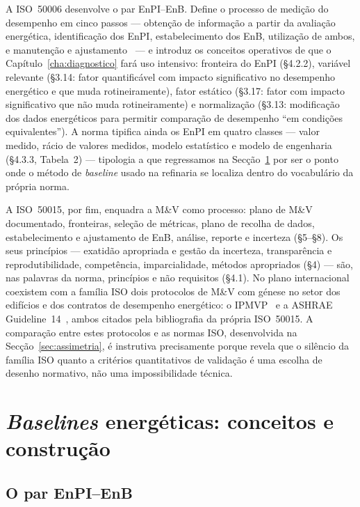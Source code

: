 A ISO~50006 desenvolve o par EnPI--EnB. Define o processo de medição do desempenho em cinco passos --- obtenção de informação a partir da avaliação energética, identificação dos EnPI, estabelecimento dos EnB, utilização de ambos, e manutenção e ajustamento~\cite[Figura~2]{ISO50006_2014} --- e introduz os conceitos operativos de que o Capítulo~\ref{cha:diagnostico} fará uso intensivo: fronteira do EnPI (\S4.2.2), variável relevante (\S3.14: fator quantificável com impacto significativo no desempenho energético e que muda rotineiramente), fator estático (\S3.17: fator com impacto significativo que não muda rotineiramente) e normalização (\S3.13: modificação dos dados energéticos para permitir comparação de desempenho \enquote{em condições equivalentes}). A norma tipifica ainda os EnPI em quatro classes --- valor medido, rácio de valores medidos, modelo estatístico e modelo de engenharia (\S4.3.3, Tabela~2) --- tipologia a que regressamos na Secção~\ref{sec:enb} por ser o ponto onde o método de \emph{baseline} usado na refinaria se localiza dentro do vocabulário da própria norma.

A ISO~50015, por fim, enquadra a M\&V como processo: plano de M\&V documentado, fronteiras, seleção de métricas, plano de recolha de dados, estabelecimento e ajustamento de EnB, análise, reporte e incerteza (\S5--\S8). Os seus princípios --- exatidão apropriada e gestão da incerteza, transparência e reprodutibilidade, competência, imparcialidade, métodos apropriados (\S4) --- são, nas palavras da norma, princípios e não requisitos (\S4.1). No plano internacional coexistem com a família ISO dois protocolos de M\&V com génese no setor dos edifícios e dos contratos de desempenho energético: o IPMVP~\cite{IPMVP_2022} e a ASHRAE Guideline~14~\cite{ASHRAE14_2014}, ambos citados pela bibliografia da própria ISO~50015. A comparação entre estes protocolos e as normas ISO, desenvolvida na Secção~\ref{sec:assimetria}, é instrutiva precisamente porque revela que o silêncio da família ISO quanto a critérios quantitativos de validação é uma escolha de desenho normativo, não uma impossibilidade técnica.

\section{\emph{Baselines} energéticas: conceitos e construção}
\label{sec:enb}

\subsection{O par EnPI--EnB}
\label{sec:enb-par}

